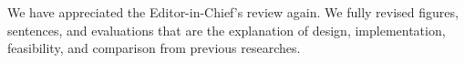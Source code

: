 \documentclass[11pt,a4paper]{article}
\begin{document}
We have appreciated the Editor-in-Chief's review again. We fully revised
figures, sentences, and evaluations that are the explanation of design,
implementation, feasibility, and comparison from previous researches.


\end{document}
